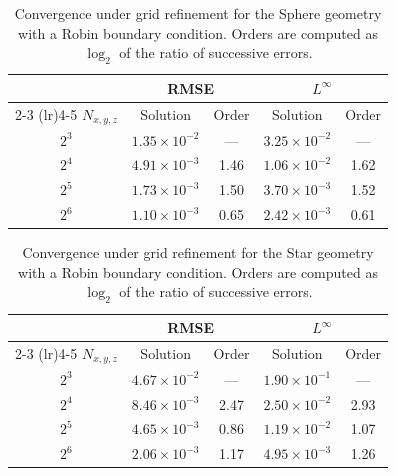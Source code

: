 
\begin{table}[H]
  \centering
  \caption{Convergence under grid refinement for the Sphere geometry with a Robin
           boundary condition. Orders are computed as $\log_{2}$ of the ratio of
           successive errors.}
  \label{tab:conv-sphere}
  \begin{tabular}{ccccc}
    \toprule
    & \multicolumn{2}{c}{RMSE} & \multicolumn{2}{c}{$L^{\infty}$} \\
    \cmidrule(lr){2-3} \cmidrule(lr){4-5}
    $N_{x,y,z}$ & Solution & Order & Solution & Order \\
    \midrule
    $2^{3}$ & $1.35 \times 10^{-2}$ & --- & $3.25 \times 10^{-2}$ & --- \\
    $2^{4}$ & $4.91 \times 10^{-3}$ & 1.46 & $1.06 \times 10^{-2}$ & 1.62 \\
    $2^{5}$ & $1.73 \times 10^{-3}$ & 1.50 & $3.70 \times 10^{-3}$ & 1.52 \\
    $2^{6}$ & $1.10 \times 10^{-3}$ & 0.65 & $2.42 \times 10^{-3}$ & 0.61 \\
    \bottomrule
  \end{tabular}
\end{table}

\begin{table}[H]
  \centering
  \caption{Convergence under grid refinement for the Star geometry with a Robin
           boundary condition. Orders are computed as $\log_{2}$ of the ratio of
           successive errors.}
  \label{tab:conv-star}
  \begin{tabular}{ccccc}
    \toprule
    & \multicolumn{2}{c}{RMSE} & \multicolumn{2}{c}{$L^{\infty}$} \\
    \cmidrule(lr){2-3} \cmidrule(lr){4-5}
    $N_{x,y,z}$ & Solution & Order & Solution & Order \\
    \midrule
    $2^{3}$ & $4.67 \times 10^{-2}$ & --- & $1.90 \times 10^{-1}$ & --- \\
    $2^{4}$ & $8.46 \times 10^{-3}$ & 2.47 & $2.50 \times 10^{-2}$ & 2.93 \\
    $2^{5}$ & $4.65 \times 10^{-3}$ & 0.86 & $1.19 \times 10^{-2}$ & 1.07 \\
    $2^{6}$ & $2.06 \times 10^{-3}$ & 1.17 & $4.95 \times 10^{-3}$ & 1.26 \\
    \bottomrule
  \end{tabular}
\end{table}

